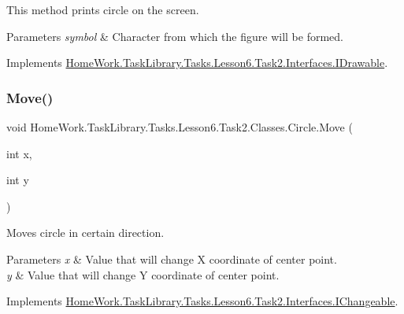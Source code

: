 This method prints circle on the screen. 


\begin{DoxyParams}{Parameters}
{\em symbol} & Character from which the figure will be formed.\\
\hline
\end{DoxyParams}


Implements \mbox{\hyperlink{interface_home_work_1_1_task_library_1_1_tasks_1_1_lesson6_1_1_task2_1_1_interfaces_1_1_i_drawable_abf1b3858b298548d8562a5e2229ac564}{Home\+Work.\+Task\+Library.\+Tasks.\+Lesson6.\+Task2.\+Interfaces.\+I\+Drawable}}.

\mbox{\label{class_home_work_1_1_task_library_1_1_tasks_1_1_lesson6_1_1_task2_1_1_classes_1_1_circle_aa133b87121d3a40da2612a9e72a3c0f4}} 
\subsubsection{\texorpdfstring{Move()}{Move()}}
{\footnotesize\ttfamily void Home\+Work.\+Task\+Library.\+Tasks.\+Lesson6.\+Task2.\+Classes.\+Circle.\+Move (\begin{DoxyParamCaption}\item[{int}]{x,  }\item[{int}]{y }\end{DoxyParamCaption})}



Moves circle in certain direction. 


\begin{DoxyParams}{Parameters}
{\em x} & Value that will change X coordinate of center point.\\
\hline
{\em y} & Value that will change Y coordinate of center point.\\
\hline
\end{DoxyParams}


Implements \mbox{\hyperlink{interface_home_work_1_1_task_library_1_1_tasks_1_1_lesson6_1_1_task2_1_1_interfaces_1_1_i_changeable_a86e3712a90bdc833d17cff47cdfd7923}{Home\+Work.\+Task\+Library.\+Tasks.\+Lesson6.\+Task2.\+Interfaces.\+I\+Changeable}}.

\mbox{\label{class_home_work_1_1_task_library_1_1_tasks_1_1_lesson6_1_1_task2_1_1_classes_1_1_circle_ab541d3592fabffaa43fc67a88b23c20e}} 
